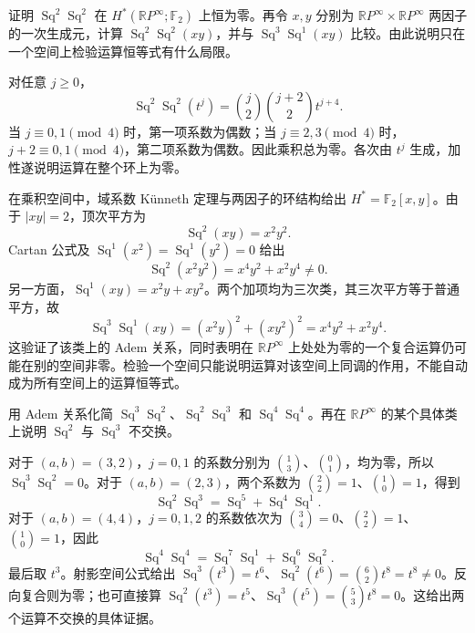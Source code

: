 \begin{exercise}\label{g2:ex:sq-two-square-on-product}
	证明 \(\operatorname{Sq}^2\operatorname{Sq}^2\) 在 \(H^*(\mathbb RP^\infty;\mathbb F_2)\) 上恒为零。再令 \(x,y\) 分别为 \(\mathbb RP^\infty\times\mathbb RP^\infty\) 两因子的一次生成元，计算 \(\operatorname{Sq}^2\operatorname{Sq}^2(xy)\)，并与 \(\operatorname{Sq}^3\operatorname{Sq}^1(xy)\) 比较。由此说明只在一个空间上检验运算恒等式有什么局限。
\end{exercise}
\begin{solution}
	对任意 \(j\ge0\)，
	\[
		\operatorname{Sq}^2\operatorname{Sq}^2(t^j)=\binom j2\binom{j+2}2t^{j+4}.
	\]
	当 \(j\equiv0,1\pmod4\) 时，第一项系数为偶数；当 \(j\equiv2,3\pmod4\) 时，\(j+2\equiv0,1\pmod4\)，第二项系数为偶数。因此乘积总为零。各次由 \(t^j\) 生成，加性遂说明运算在整个环上为零。

	在乘积空间中，域系数 Künneth 定理与两因子的环结构给出 \(H^*=\mathbb F_2[x,y]\)。由于 \(|xy|=2\)，顶次平方为
	\[
		\operatorname{Sq}^2(xy)=x^2y^2.
	\]
	Cartan 公式及 \(\operatorname{Sq}^1(x^2)=\operatorname{Sq}^1(y^2)=0\) 给出
	\[
		\operatorname{Sq}^2(x^2y^2)=x^4y^2+x^2y^4\ne0.
	\]
	另一方面，\(\operatorname{Sq}^1(xy)=x^2y+xy^2\)。两个加项均为三次类，其三次平方等于普通平方，故
	\[
		\operatorname{Sq}^3\operatorname{Sq}^1(xy)=(x^2y)^2+(xy^2)^2=x^4y^2+x^2y^4.
	\]
	这验证了该类上的 Adem 关系，同时表明在 \(\mathbb RP^\infty\) 上处处为零的一个复合运算仍可能在别的空间非零。检验一个空间只能说明运算对该空间上同调的作用，不能自动成为所有空间上的运算恒等式。
\end{solution}

\begin{exercise}\label{g2:ex:adem-noncommuting-low-products}
	用 Adem 关系化简 \(\operatorname{Sq}^3\operatorname{Sq}^2\)、\(\operatorname{Sq}^2\operatorname{Sq}^3\) 和 \(\operatorname{Sq}^4\operatorname{Sq}^4\)。再在 \(\mathbb RP^\infty\) 的某个具体类上说明 \(\operatorname{Sq}^2\) 与 \(\operatorname{Sq}^3\) 不交换。
\end{exercise}
\begin{solution}
	对于 \((a,b)=(3,2)\)，\(j=0,1\) 的系数分别为 \(\binom13\)、\(\binom01\)，均为零，所以 \(\operatorname{Sq}^3\operatorname{Sq}^2=0\)。对于 \((a,b)=(2,3)\)，两个系数为 \(\binom22=1\)、\(\binom10=1\)，得到
	\[
		\operatorname{Sq}^2\operatorname{Sq}^3=\operatorname{Sq}^5+\operatorname{Sq}^4\operatorname{Sq}^1.
	\]
	对于 \((a,b)=(4,4)\)，\(j=0,1,2\) 的系数依次为 \(\binom34=0\)、\(\binom22=1\)、\(\binom10=1\)，因此
	\[
		\operatorname{Sq}^4\operatorname{Sq}^4=\operatorname{Sq}^7\operatorname{Sq}^1+\operatorname{Sq}^6\operatorname{Sq}^2.
	\]
	最后取 \(t^3\)。射影空间公式给出 \(\operatorname{Sq}^3(t^3)=t^6\)、\(\operatorname{Sq}^2(t^6)=\binom62t^8=t^8\ne0\)。反向复合则为零；也可直接算 \(\operatorname{Sq}^2(t^3)=t^5\)、\(\operatorname{Sq}^3(t^5)=\binom53t^8=0\)。这给出两个运算不交换的具体证据。
\end{solution}

